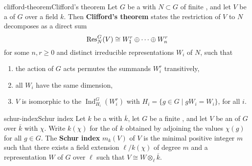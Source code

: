 \begin{topic}{clifford-theorem}{Clifford's theorem}
    Let $G$ be a  with  $N \subset G$ of finite , and let $V$ be a   of $G$ over a field $k$. Then \textbf{Clifford's theorem} states the restriction of $V$ to $N$ decomposes as a direct sum
    \[ \textup{Res}^G_N(V) \cong W_1^r \oplus \cdots \oplus W_n^r \]
    for some $n, r \ge 0$ and distinct irreducible representations $W_i$ of $N$, such that
    \begin{enumerate}[label=(\roman*)]
        \item the action of $G$ acts permutes the summands $W_i^r$ transitively,
        \item all $W_i$ have the same dimension,
        \item $V$ is isomorphic to the  $\operatorname{Ind}_{H_i}^G(W_i^r)$ with $H_i = \{ g \in G \mid g W_i = W_i \}$, for all $i$.
    \end{enumerate}
\end{topic}

\begin{topic}{schur-index}{Schur index}
    Let $k$ be a  with  $\overline{k}$, let $G$ be a finite , and let $V$ be an  of $G$ over $\overline{k}$ with  $\chi$. Write $k(\chi)$ for the  of $k$ obtained by adjoining the values $\chi(g)$ for all $g \in G$.
    The \textbf{Schur index} $m_k(V)$ of $V$ is the minimal positive integer $m$ such that there exists a field extension $\ell / k(\chi)$ of degree $m$ and a representation $W$ of $G$ over $\ell$ such that $V \cong W \otimes_\ell \overline{k}$.
\end{topic}

